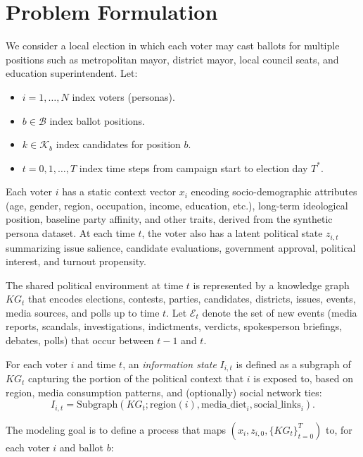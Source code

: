 \documentclass[11pt]{article}
\begin{document}
\section{Problem Formulation}

We consider a local election in which each voter may cast ballots for multiple positions such as metropolitan mayor, district mayor, local council seats, and education superintendent. Let:

\begin{itemize}
  \item $i = 1, \dots, N$ index voters (personas).
  \item $b \in \mathcal{B}$ index ballot positions.
  \item $k \in \mathcal{K}_b$ index candidates for position $b$.
  \item $t = 0, 1, \dots, T$ index time steps from campaign start to election day $T^*$.
\end{itemize}

Each voter $i$ has a static context vector $x_i$ encoding socio-demographic attributes (age, gender, region, occupation, income, education, etc.), long-term ideological position, baseline party affinity, and other traits, derived from the synthetic persona dataset. At each time $t$, the voter also has a latent political state $z_{i,t}$ summarizing issue salience, candidate evaluations, government approval, political interest, and turnout propensity.

The shared political environment at time $t$ is represented by a knowledge graph $KG_t$ that encodes elections, contests, parties, candidates, districts, issues, events, media sources, and polls up to time $t$. Let $\mathcal{E}_t$ denote the set of new events (media reports, scandals, investigations, indictments, verdicts, spokesperson briefings, debates, polls) that occur between $t-1$ and $t$.

For each voter $i$ and time $t$, an \emph{information state} $I_{i,t}$ is defined as a subgraph of $KG_t$ capturing the portion of the political context that $i$ is exposed to, based on region, media consumption patterns, and (optionally) social network ties:
\begin{equation}
I_{i,t} = \text{Subgraph}(KG_t; \text{region}(i), \text{media\_diet}_i, \text{social\_links}_i).
\end{equation}

The modeling goal is to define a process that maps $(x_i, z_{i,0}, \{KG_t\}_{t=0}^T)$ to, for each voter $i$ and ballot $b$:
\end{document}
